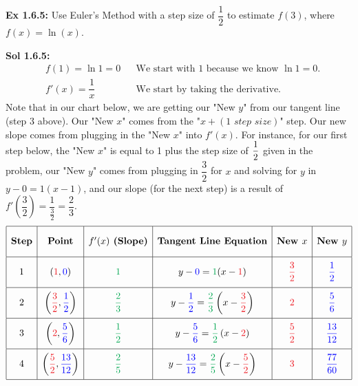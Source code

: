 \begin{tcolorbox}[example]
    \textbf{Ex 1.6.5: } Use Euler's Method with a step size of $\dfrac{1}{2}$ to estimate $f(3)$, where $f(x) = \ln (x)$.
\end{tcolorbox}
\begin{tcolorbox}[solution]
    \textbf{Sol 1.6.5: } \begin{align*}
        & f(1) = \ln 1 = 0 && \text{We start with 1 because we know } \ln 1 = 0. \\[11pt]
        & f'(x) = \dfrac{1}{x} && \text{We start by taking the derivative.}
    \end{align*}
    Note that in our chart below, we are getting our "New $y$" from our tangent line (step 3 above). Our "New $x$" comes from the "$x + (\textit{1 step size})$" step. Our new slope comes from plugging in the "New $x$" into $f'(x)$. For instance, for our first step below, the "New $x$" is equal to 1 plus the step size of $\dfrac{1}{2} \smallforcespace$ given in the problem, our "New $y$" comes from plugging in $\dfrac{3}{2}$ for $x$ and solving for $y$ in $y - 0 = 1(x - 1)$, and our slope (for the next step) is a result of $f'\left(\dfrac{3}{2}\right) = \dfrac{1}{\frac{3}{2}} = \dfrac{2}{3}$. \\
    \begin{align*} 
        \def\arraystretch{2.2} 
        \begin{array}{|c|c|c|c|c|c|}
            \hline 
            \textbf{Step} & \textbf{Point} & f'(x) \textbf{ (Slope)} & \textbf{Tangent Line Equation} & \textbf{New } x & \textbf{New } y \\[5.5pt] \hline
            1 & (\textcolor{Red}{1}, \textcolor{blue}{0}) & \textcolor{Green}{1} & y - \textcolor{blue}{0} = \textcolor{Green}{1}(x - \textcolor{Red}{1}) & \textcolor{Red}{\dfrac{3}{2}} & \textcolor{blue}{\dfrac{1}{2}} \\[5.5pt] \hline
            2 & \left(\textcolor{Red}{\dfrac{3}{2}}, \textcolor{blue}{\dfrac{1}{2}}\right) & \textcolor{Green}{\dfrac{2}{3}} & y - \textcolor{blue}{\dfrac{1}{2}} = \textcolor{Green}{\dfrac{2}{3}}\left(x - \textcolor{Red}{\dfrac{3}{2}}\right) & \textcolor{Red}{2} & \textcolor{blue}{\dfrac{5}{6}} \\[5.5pt] \hline
            3 & \left(\textcolor{Red}{2}, \textcolor{blue}{\dfrac{5}{6}}\right) & \textcolor{Green}{\dfrac{1}{2}} & y - \textcolor{blue}{\dfrac{5}{6}} = \textcolor{Green}{\dfrac{1}{2}}\left(x - \textcolor{Red}{2}\right) & \textcolor{Red}{\dfrac{5}{2}} & \textcolor{blue}{\dfrac{13}{12}} \\[5.5pt] \hline
            4 & \left(\textcolor{Red}{\dfrac{5}{2}}, \textcolor{blue}{\dfrac{13}{12}}\right) & \textcolor{Green}{\dfrac{2}{5}} & y - \textcolor{blue}{\dfrac{13}{12}} = \textcolor{Green}{\dfrac{2}{5}}\left(x - \textcolor{Red}{\dfrac{5}{2}}\right) & \textcolor{Red}{3} & \textcolor{blue}{\dfrac{77}{60}} \\[5.5pt]
            \hline
        \end{array}
    \end{align*}


\end{tcolorbox}

